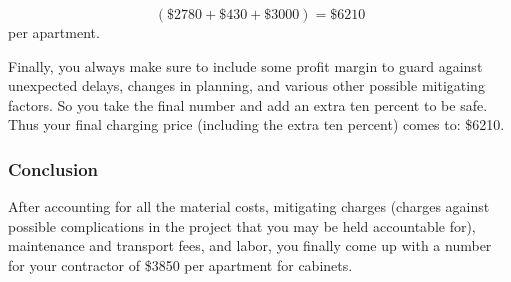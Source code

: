 {\[
(\$2780 + \$430 + \$ 3000) = \$6210
\]
per apartment.

Finally, you always make sure to include some profit margin to guard against unexpected delays, changes in planning, and various other possible mitigating factors. So you take the final number and add an extra ten percent to be safe. Thus your final charging price (including the extra ten percent) comes to: \$6210.

\subsubsection*{Conclusion}

After accounting for all the material costs, mitigating charges (charges against possible complications in the project that you may be held accountable for), maintenance and transport fees, and labor, you finally come up with a number for your contractor of \$3850 per apartment for cabinets.

}%




